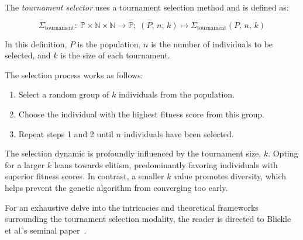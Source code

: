   \begin{definition}
  \label{def:keen:op:select:tournament}
    The \emph{tournament selector} uses a tournament selection method and is defined as:

    \begin{equation}
      \Sigma_\mathrm{tournament} :\: 
        \mathbb{P} \times \mathbb{N} \times \mathbb{N} \to \mathbb{P};\;
      (P,\, n,\, k) \mapsto \Sigma_\mathrm{tournament}(P,\, n,\, k)
    \end{equation}

    In this definition, \(P\) is the population, \(n\) is the number of individuals to be selected, and \(k\) is the 
    size of each tournament.

    The selection process works as follows:

    \begin{enumerate}
      \item Select a random group of \(k\) individuals from the population.
      \item Choose the individual with the highest fitness score from this group.
      \item Repeat steps 1 and 2 until \(n\) individuals have been selected.
    \end{enumerate}
  \end{definition}

\begin{remark}
  The selection dynamic is profoundly influenced by the tournament size, 
  \(k\).
  Opting for a larger \(k\) leans towards elitism, predominantly favoring 
  individuals with superior fitness scores.
  In contrast, a smaller \(k\) value promotes diversity, which helps prevent the genetic algorithm from converging too early.
\end{remark}

For an exhaustive delve into the intricacies and theoretical frameworks surrounding the tournament selection modality, 
the reader is directed to Blickle et al.'s seminal paper~\autocite{blickleMathematicalAnalysisTournament1995}.
